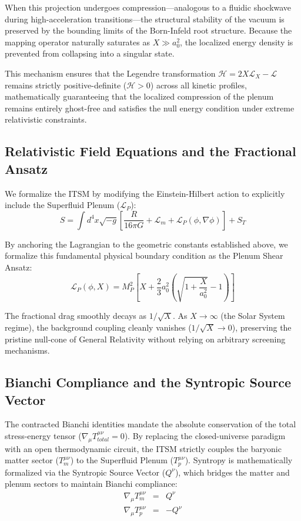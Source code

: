 \documentclass[aps,prd,10pt,onecolumn,superscriptaddress,nofootinbib]{revtex4-2}
\begin{document}
When this projection undergoes compression—analogous to a fluidic shockwave during high-acceleration transitions—the structural stability of the vacuum is preserved by the bounding limits of the Born-Infeld root structure. Because the mapping operator naturally saturates as $X \gg a_0^2$, the localized energy density is prevented from collapsing into a singular state. 

This mechanism ensures that the Legendre transformation $\mathcal{H} = 2X\mathcal{L}_X - \mathcal{L}$ remains strictly positive-definite ($\mathcal{H} > 0$) across all kinetic profiles, mathematically guaranteeing that the localized compression of the plenum remains entirely ghost-free and satisfies the null energy condition under extreme relativistic constraints.

\subsection{Relativistic Field Equations and the Fractional Ansatz}
We formalize the ITSM by modifying the Einstein-Hilbert action to explicitly include the Superfluid Plenum ($\mathcal{L}_P$):
\begin{equation}
S = \int d^4x \sqrt{-g} \left[ \frac{R}{16\pi G} + \mathcal{L}_m + \mathcal{L}_P(\phi, \nabla\phi) \right] + S_T
\end{equation}

By anchoring the Lagrangian to the geometric constants established above, we formalize this fundamental physical boundary condition as the Plenum Shear Ansatz:
\begin{equation} \label{eq:plenum_shear_ansatz}
\mathcal{L}_P(\phi, X) = M_P^2 \left[ X + \frac{2}{3}a_0^2 \left(\sqrt{1+\frac{X}{a_0^2}} - 1 \right) \right]
\end{equation}

The fractional drag smoothly decays as $1/\sqrt{X}$. As $X \rightarrow \infty$ (the Solar System regime), the background coupling cleanly vanishes ($1/\sqrt{X} \rightarrow 0$), preserving the pristine null-cone of General Relativity without relying on arbitrary screening mechanisms.

\subsection{Bianchi Compliance and the Syntropic Source Vector}
The contracted Bianchi identities mandate the absolute conservation of the total stress-energy tensor ($\nabla_\mu T_{total}^{\mu\nu} = 0$). By replacing the closed-universe paradigm with an open thermodynamic circuit, the ITSM strictly couples the baryonic matter sector ($T_m^{\mu\nu}$) to the Superfluid Plenum ($T_p^{\mu\nu}$). Syntropy is mathematically formalized via the Syntropic Source Vector ($Q^\nu$), which bridges the matter and plenum sectors to maintain Bianchi compliance:
\begin{eqnarray}
\nabla_\mu T_m^{\mu\nu} &=& Q^\nu \\
\nabla_\mu T_p^{\mu\nu} &=& -Q^\nu
\end{eqnarray}
\end{document}
